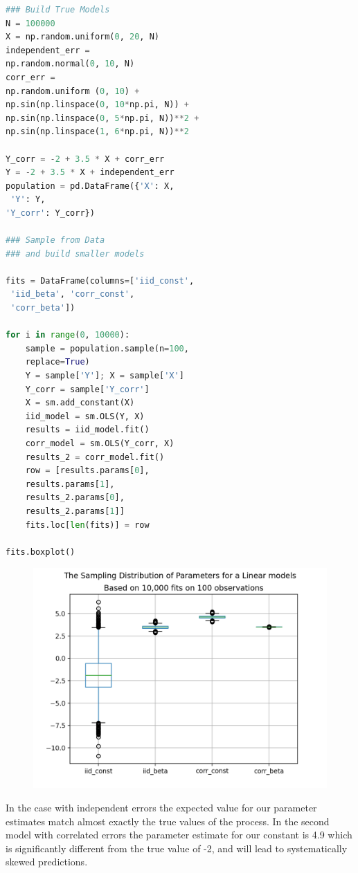 \documentclass[10pt,a4paper,notitlepage, twocolumn]{article}
\begin{document}
\begin{lstlisting}[language=Python]
### Build True Models
N = 100000
X = np.random.uniform(0, 20, N)
independent_err = 
np.random.normal(0, 10, N)
corr_err = 
np.random.uniform (0, 10) + 
np.sin(np.linspace(0, 10*np.pi, N)) + 
np.sin(np.linspace(0, 5*np.pi, N))**2 + 
np.sin(np.linspace(1, 6*np.pi, N))**2

Y_corr = -2 + 3.5 * X + corr_err
Y = -2 + 3.5 * X + independent_err
population = pd.DataFrame({'X': X,
 'Y': Y, 
'Y_corr': Y_corr})

### Sample from Data 
### and build smaller models

fits = DataFrame(columns=['iid_const',
 'iid_beta', 'corr_const', 
 'corr_beta'])
 
for i in range(0, 10000):
    sample = population.sample(n=100, 
    replace=True)
    Y = sample['Y']; X = sample['X']
    Y_corr = sample['Y_corr']
    X = sm.add_constant(X)
    iid_model = sm.OLS(Y, X)
    results = iid_model.fit()
    corr_model = sm.OLS(Y_corr, X)
    results_2 = corr_model.fit()
    row = [results.params[0], 
    results.params[1],
    results_2.params[0], 
    results_2.params[1]]
    fits.loc[len(fits)] = row
    
fits.boxplot()
\end{lstlisting}


\begin{figure}[H]
  \includegraphics[width=\linewidth]{./Plots/distribution_of_beta1.png}
\end{figure}

In the case with independent errors the expected value for our parameter estimates match almost exactly the true values of the process. In the second model with correlated errors the parameter estimate for our constant is 4.9 which is significantly different from the true value of -2, and will lead to systematically skewed predictions.
\end{document}
